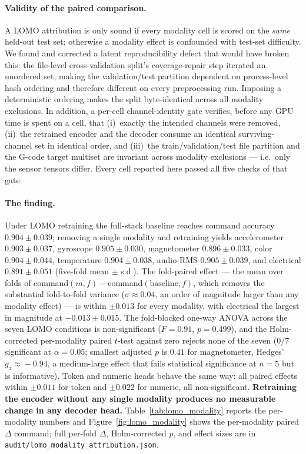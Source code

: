 \documentclass[sensors,article,submit,moreauthors,pdftex]{Definitions/mdpi}
\begin{document}
\paragraph{Validity of the paired comparison.} A LOMO attribution is only
sound if every modality cell is scored on the \emph{same} held-out test set;
otherwise a modality effect is confounded with test-set difficulty. We found
and corrected a latent reproducibility defect that would have broken this: the
file-level cross-validation split's coverage-repair step iterated an unordered
set, making the validation/test partition dependent on process-level hash
ordering and therefore different on every preprocessing run. Imposing a
deterministic ordering makes the split byte-identical across all modality
exclusions. In addition, a per-cell channel-identity gate verifies, before any
GPU time is spent on a cell, that (i)~exactly the intended channels were
removed, (ii)~the retrained encoder and the decoder consume an identical
surviving-channel set in identical order, and (iii)~the train/validation/test
file partition and the G-code target multiset are invariant across modality
exclusions --- i.e.\ only the sensor tensors differ. Every cell reported here
passed all five checks of that gate.

\paragraph{The finding.} Under LOMO retraining the full-stack baseline reaches
command accuracy $0.904 \pm 0.039$; removing a single modality and retraining
yields accelerometer $0.903 \pm 0.037$, gyroscope $0.905 \pm 0.030$,
magnetometer $0.896 \pm 0.033$, color $0.904 \pm 0.044$, temperature
$0.904 \pm 0.038$, audio-RMS $0.905 \pm 0.039$, and electrical
$0.891 \pm 0.051$ (five-fold mean $\pm$ s.d.). The fold-paired effect ---
the mean over folds of command$(m,f)-$command$(\text{baseline},f)$, which
removes the substantial fold-to-fold variance ($\sigma \approx 0.04$, an order
of magnitude larger than any modality effect) --- is within $\pm 0.013$ for
every modality, with electrical the largest in magnitude at
$-0.013 \pm 0.015$. The fold-blocked one-way ANOVA across the seven LOMO
conditions is non-significant ($F=0.91$, $p=0.499$), and the Holm-corrected
per-modality paired $t$-test against zero rejects none of the seven
($0/7$ significant at $\alpha=0.05$; smallest adjusted $p$ is $0.41$ for
magnetometer, Hedges' $g_{z}\!\approx\!-0.94$, a medium-large effect that
fails statistical significance at $n\!=\!5$ but is informative). Token and numeric heads behave the same way: all paired
effects within $\pm 0.011$ for token and $\pm 0.022$ for numeric, all
non-significant. \textbf{Retraining the encoder without any single modality
produces no measurable change in any decoder head.}
Table~\ref{tab:lomo_modality} reports the per-modality numbers and
Figure~\ref{fig:lomo_modality} shows the per-modality paired $\Delta$ command;
full per-fold $\Delta$, Holm-corrected $p$, and effect sizes are in
\texttt{audit/lomo\_modality\_attribution.json}.
\end{document}
